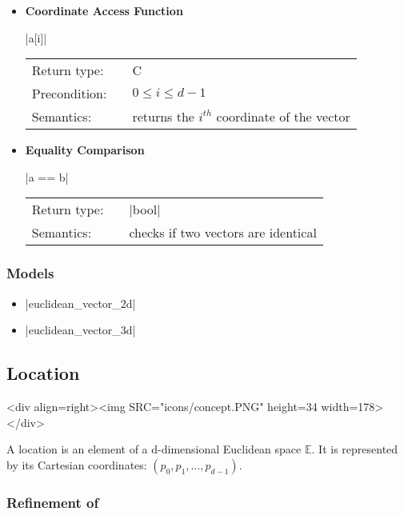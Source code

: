 \documentclass[12pt,twoside]{report}
\begin{document}
\begin{itemize}
\item {\bf Coordinate Access Function}

  |a[i]|

  \begin{tabular}[!h]{l p{1cm} p{10cm}}
    Return type: & & C\\
    Precondition: & & \mbox{$0 \le i \le d-1$}\\
    Semantics: & & returns the $i^{th}$ coordinate of the vector\\
  \end{tabular}


\item {\bf Equality Comparison}

  |a == b|

  \begin{tabular}[!h]{l p{1cm} p{10cm}}
    Return type: & & |bool|\\
    Semantics: & & checks if two vectors are identical\\
  \end{tabular}


\end{itemize}


\htmlrule[CLEAR=all]  \subsubsection*{Models}
\begin{itemize}
\item |euclidean_vector_2d|
\item |euclidean_vector_3d|
\end{itemize}





\subsection{Location}
\label{concept:location}
\begin{htmlonly}
<div align=right><img SRC="icons/concept.PNG" height=34 width=178></div>
\end{htmlonly}

A location is an element of a d-dimensional Euclidean space $\mathbb{E}$. It is represented by its Cartesian coordinates: \mbox{$(p_0,p_1,\ldots,p_{d-1})$}.  


\htmlrule[CLEAR=all]  \subsubsection*{Refinement of}
\end{document}
